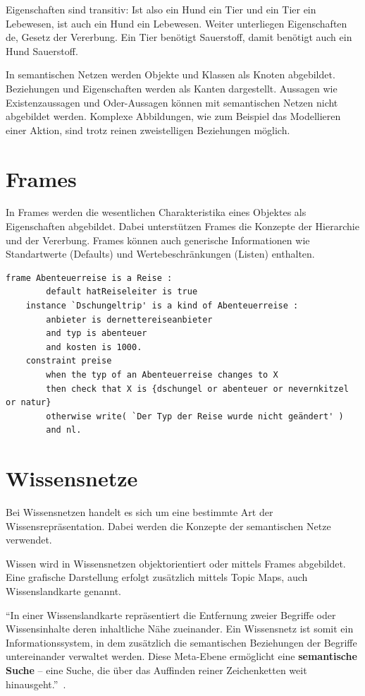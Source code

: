 Eigenschaften sind transitiv: Ist also ein Hund ein Tier und ein Tier ein Lebewesen, ist auch ein Hund ein Lebewesen. Weiter unterliegen Eigenschaften de, Gesetz der Vererbung. Ein Tier benötigt Sauerstoff, damit benötigt auch ein Hund Sauerstoff.

In semantischen Netzen werden Objekte und Klassen als Knoten abgebildet. Beziehungen und Eigenschaften werden als Kanten dargestellt.
Aussagen wie Existenzaussagen und Oder-Aussagen können mit semantischen Netzen nicht abgebildet werden.
Komplexe Abbildungen, wie zum Beispiel das Modellieren einer Aktion, sind trotz reinen zweistelligen Beziehungen möglich.

\section{Frames}
\label{sec:wissensrepFormen_frames}

In Frames werden die wesentlichen Charakteristika eines Objektes als Eigenschaften abgebildet. Dabei unterstützen Frames die Konzepte der Hierarchie und der Vererbung. Frames können auch generische Informationen wie Standartwerte (Defaults) und Wertebeschränkungen (Listen) enthalten.

\begin{lstlisting}[caption={Beispiel eines Frames anhand einer Reise.}]
    frame Abenteuerreise is a Reise :
        default hatReiseleiter is true
    instance `Dschungeltrip' is a kind of Abenteuerreise :
        anbieter is dernettereiseanbieter
        and typ is abenteuer
        and kosten is 1000.
    constraint preise
        when the typ of an Abenteuerreise changes to X
        then check that X is {dschungel or abenteuer or nevernkitzel or natur}
        otherwise write( `Der Typ der Reise wurde nicht geändert' )
        and nl.
\end{lstlisting}

\section{Wissensnetze}
\label{sec:wissensrepFormen_Wissensnetze}
Bei Wissensnetzen handelt es sich um eine bestimmte Art der Wissensrepräsentation. Dabei werden die Konzepte der semantischen Netze verwendet.

Wissen wird in Wissensnetzen objektorientiert oder mittels Frames abgebildet. Eine grafische Darstellung erfolgt zusätzlich mittels Topic Maps, auch Wissenslandkarte genannt.

``In einer Wissenslandkarte repräsentiert die Entfernung zweier Begriffe oder Wissensinhalte deren inhaltliche Nähe zueinander. Ein Wissensnetz ist somit ein Informationssystem, in dem zusätzlich die semantischen Beziehungen der Begriffe untereinander verwaltet werden. Diese Meta-Ebene ermöglicht eine \textbf{semantische Suche} – eine Suche, die über das Auffinden reiner Zeichenketten weit hinausgeht.''~\cite[S. 89]{laemmel}.

